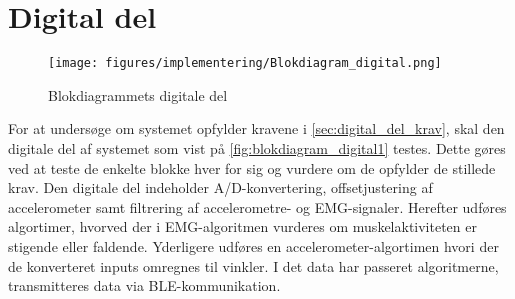 \section{Digital del}
\begin{figure}[H]
\centering
\texttt{[image: figures/implementering/Blokdiagram\_digital.png]}
\caption{Blokdiagrammets digitale del}
\label{fig:blokdiagram_digital1}
\end{figure}

For at undersøge om systemet opfylder kravene i \autoref{sec:digital_del_krav}, skal den digitale del af systemet som vist på \autoref{fig:blokdiagram_digital1} testes. Dette gøres ved at teste de enkelte blokke hver for sig og vurdere om de opfylder de stillede krav. Den digitale del indeholder A/D-konvertering, offsetjustering af accelerometer samt filtrering af accelerometre- og EMG-signaler. Herefter udføres algortimer, hvorved der i EMG-algoritmen vurderes om muskelaktiviteten er stigende eller faldende. Yderligere udføres en accelerometer-algortimen hvori der de konverteret inputs omregnes til vinkler. I det data har passeret algoritmerne, transmitteres data via BLE-kommunikation.